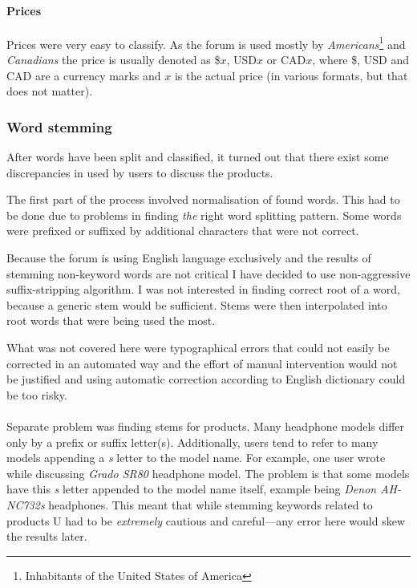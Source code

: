       \paragraph{Prices}
      
        Prices were very easy to classify. As the forum is used mostly by \emph{Americans}\footnote{Inhabitants of the United States of America} and \emph{Canadians} the price is usually denoted as \$$x$, USD$x$ or CAD$x$, where \$, USD and CAD are a currency marks and $x$ is the actual price (in various formats, but that does not matter).

    \subsubsection{Word stemming}
    
      After words have been split and classified, it turned out that there exist some discrepancies in  used by users to discuss the products.
      
      The first part of the process involved normalisation of found words. This had to be done due to problems in finding \emph{the} right word splitting pattern. Some words were prefixed or suffixed by additional characters that were not correct.
      
      Because the forum is using English language exclusively and the results of stemming non-keyword words are not critical I have decided to use non-aggressive suffix-stripping algorithm. I was not interested in finding correct root of a word, because a generic stem would be sufficient. Stems were then interpolated into root words that were being used the most.
      
      What was not covered here were typographical errors that could not easily be corrected in an automated way and the effort of manual intervention would not be justified and using automatic correction according to English dictionary could be too risky.
      \\\\
      Separate problem was finding stems for products. Many headphone models differ only by a prefix or suffix letter(s). Additionally, users tend to refer to many models appending a \emph{s} letter to the model name. For example, one user wrote  while discussing \emph{Grado SR80} headphone model. The problem is that some models have this  \emph{s} letter appended to the model name itself, example being \emph{Denon AH-NC732s} headphones. This meant that while stemming keywords related to products U had to be \emph{extremely} cautious and careful---any error here would skew the results later.
      
